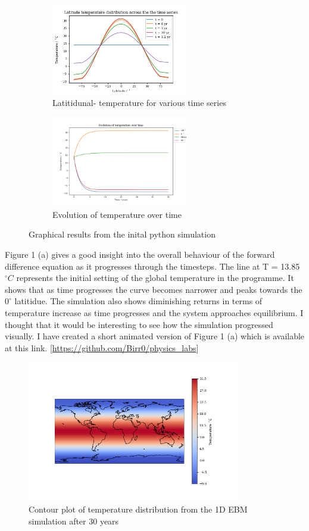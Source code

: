 \documentclass{article}%
\begin{document}
\begin{figure}[H]%
  \centering%
  \begin{subfigure}{0.4\textwidth}
    \includegraphics[width=225px]{multi-time-temp-distribution.png}%
    \caption{Latitidunal- temperature for various time series }%
  \end{subfigure}
  \begin{subfigure}{0.4\textwidth}
    \includegraphics[width=225px]{temperature-evolution.png}%
    \caption{Evolution of temperature over time}%
  \end{subfigure}
  \caption{Graphical results from the inital python simulation}
\end{figure}

Figure 1 (a) gives a good insight into the overall behaviour of the forward difference equation as it progresses through the timesteps.
The line at T = 13.85$^\circ C$ represents the initial setting of the global temperature in the programme.
It shows that as time progresses the curve becomes narrower and peaks towards the $0 ^\circ $ latitidue. 
The simulation also shows diminishing returns in terms of temperature increase as time progresses and the system approaches equilibrium.
I thought that it would be interesting to see how the simulation progressed visually. I have created a short animated version of Figure 1 (a) which is available at this link. [\url{https://github.com/Birr0/physics_labs}]

\begin{figure}[H]%
  \centering%
  \includegraphics[width=350px]{global-temp-distribution.png}
  \caption{Contour plot of temperature distribution from the 1D EBM simulation after 30 years}
\end{figure}
\end{document}
